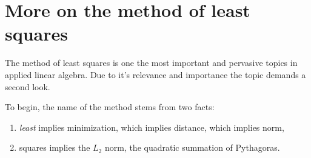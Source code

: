 \chapter[Least squares]{More on the method of least squares}
The method of least squares is one the most important and pervasive topics in applied linear algebra. Due to it's relevance and importance the topic demands a second look.

To begin, the name of the method stems from two facts:
\begin{enumerate}
\item \textit{least} implies minimization, which implies distance, which implies norm,
\item {squares} implies the $L_{2}$ norm, the quadratic summation of Pythagoras.
\end{enumerate}





%

%





\endinput